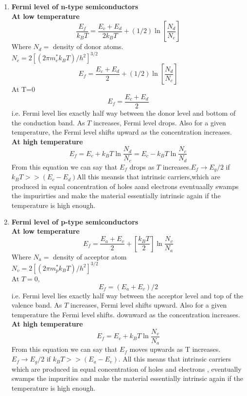 \begin{enumerate}

	\item \textbf{Fermi level of n-type semiconductors }\\
\textbf{At low temperature}\\
$$\frac{E_{f}}{k_{B} T}=\frac{E_{c}+E_{d}}{2 k_{B} T}+(1 / 2) \ln \left[\frac{N_{d}}{N_{c}}\right]$$
Where $N_d=$ density of donor atoms.\\
$N_c=2\left[ (2\pi m_e^* k_BT)/h^2\right] ^{3/2}$
$$E_f=\frac{E_{c}+E_{d}}{2}+(1 / 2) \ln \left[\frac{N_{d}}{N_{c}}\right]$$
At T=0 \\
$$E_f=\frac{E_c+E_d}{2}$$
i.e. Fermi level lies exactly half way between the donor level and bottom of the conduction band. As $T$ increases, Fermi level drops. Also for a given temperature, the Fermi level shifts upward as the concentration increases.\\
\textbf{At high temperature}\\
$$E_{f}=E_{c}+k_{B} T \ln \frac{N_{d}}{N_{c}}=E_{c}-k_{B} T \ln \frac{N_{c}}{N_{d}}$$
From this equation we can say that $E_f$ drops as $T$ increases.$E_f\rightarrow E_g/2$ if $k_BT>>(E_c-E_d)$All this meansis that intrinsic carriers,which are produced in equal concentration of holes aand electrons eventuaally swamps the impurirties and make the material essentially intrinsic again if the temperature is high enough.
\item \textbf{Fermi level of p-type semiconductors}\\
\textbf{At low temperature}\\
$$E_f=\frac{E_{a}+E_{v}}{2}+\left[\frac{k_{B} T}{2}\right] \ln \frac{N_{v}}{N_{a}}$$
Where $N_a=$ density of acceptor atom\\
$N_v=2\left[ (2\pi m_p^* k_BT)/h^2\right] ^{3/2}$\\
At $T=0$, $$E_{f}=\left(E_{a}+E_{v}\right) / 2$$ 
i.e. Fermi level lies exactly half way between the acceptor level and top of the valence band. As $T$ increases, Fermi level shifts upward. Also for a given temperature the Fermi level shifts. downward as the concentration increases.\\
\textbf{At high temperature} \\
$$E_{f}=E_{v}+k_{B} T \ln \frac{N_{v}}{N_{a}}$$
From this equation we can say that $E_f$ moves upwards as T increases.$E_f\rightarrow E_g/2$ if $ k_BT>>(E_a-E_v)$. All this means that intrinsic carriers which are produced in equal concentration of holes and electrons , eventually swamps the impurities and make the material essentially intrinsic again if the temperature is high enough.
\end{enumerate}
